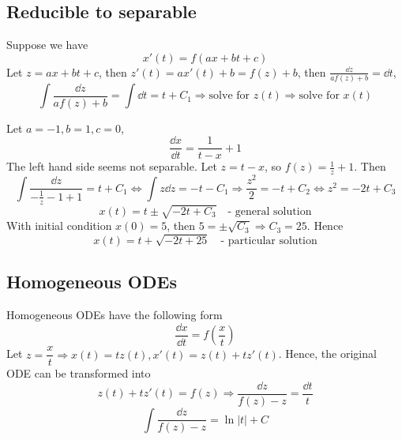 \documentclass[twoside]{article}
\begin{document}
\subsection{Reducible to separable} 
Suppose we have
\[
x'(t) = f(a x + b t + c)
\]
Let $z = a x + b t + c$, then $z'(t) = a x'(t)+b = f(z) + b$, then $\frac{\dd z}{a f(z) + b} = \dd t$,
\[
    \int \frac{\dd z}{a f(z) + b} = \int \dd t = t + C_1
    \Longrightarrow \text{solve for } z(t) \Longrightarrow \text{solve for } x(t)
\]

\begin{example}
    Let $a = -1, b=1, c= 0$,
    \[
    \frac{\dd x}{\dd t} = \frac{1}{t-x} + 1
    \]
    The left hand side seems not separable. Let $z = t-x$, so $f(z) = \frac{1}{z}+1$. Then 
    \[
    \int \frac{\dd z}{-\frac{1}{z}-1+1} = t + C_1
    \iff \int z \dd z = -t - C_1 \Longrightarrow \frac{z^2}{2} = -t + C_2 \iff {z^2} = -2t + C_3
    \]
    \begin{equation}
    x(t) = t \pm \sqrt{-2t + C_3} \quad \text{- general solution}
    \end{equation}
    With initial condition $x(0) = 5$, then $5 = \pm \sqrt{C_3} \Longrightarrow C_3 = 25$. Hence
    \begin{equation}
        x(t) = t + \sqrt{-2t + 25} \quad \text{- particular solution}
    \end{equation}
\end{example}

\subsection{Homogeneous ODEs}
Homogeneous ODEs have the following form
\[
\frac{\dd x}{\dd t} = f(\frac{x}{t})
\]
Let $z = \dfrac{x}{t} \Longrightarrow x(t) = t z(t), x'(t) = z(t) + t z'(t) $. 
Hence, the original ODE can be transformed into
\begin{equation}
    z(t) + t z'(t) = f(z) \Longrightarrow \frac{\dd z}{f(z) - z} = \frac{\dd t}{t}
\end{equation}
\begin{equation}
    \int \frac{\dd z}{f(z) - z} = \ln |t| + C
\end{equation}
\end{document}
